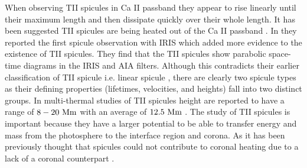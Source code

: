 \documentclass[12pt]{ociamthesis}
\begin{document}
%
When observing TII spicules in Ca II passband they appear to rise linearly until their maximum length and then dissipate quickly over their whole length. It has been suggested TII spicules are being heated out of the Ca II passband \citep{Pontieu2007PASJ, Pereira2012, Skogsrud2015ApJ806170S, Chintzoglou2018ApJ85773C, Chintzoglou2021ApJ90682C}. In \cite{Pereira2014ApJ} they reported the first spicule observation with IRIS which added more evidence to the existence of TII spicules. They find that the TII spicules show parabolic space-time diagrams in the IRIS and AIA filters. Although this contradicts their earlier classification of TII spicule i.e. linear spicule \citep{Pereira2012}, there are clearly two spicule types as their defining properties (lifetimes, velocities, and heights) fall into two distinct groups. In multi-thermal studies of TII spicules height are reported to have a range of $8-20~\rm{Mm}$ with an average of $12.5~\rm{Mm}$ \citep{Pereira2014ApJ, Skogsrud2015ApJ806170S}. The study of TII spicules is important because they have a larger potential to be able to transfer energy and mass from the photosphere to the interface region and corona. As it has been previously thought that spicules could not contribute to coronal heating due to a lack of a  coronal counterpart \citep{Withbroe1983ApJ}.
\end{document}
